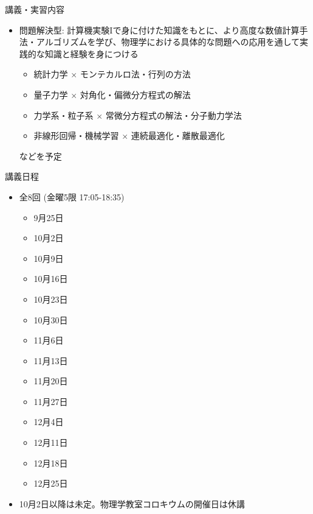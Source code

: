 \begin{frame}[t]{講義・実習内容}
  \begin{itemize}
    \setlength{\itemsep}{1em}
  \item 問題解決型: 計算機実験Iで身に付けた知識をもとに、より高度な数値計算手法・アルゴリズムを学び、物理学における具体的な問題への応用を通して実践的な知識と経験を身につける
    \begin{itemize}
    \item 統計力学 $\times$ モンテカルロ法・行列の方法
    \item 量子力学 $\times$ 対角化・偏微分方程式の解法
    \item 力学系・粒子系 $\times$ 常微分方程式の解法・分子動力学法
    \item 非線形回帰・機械学習 $\times$ 連続最適化・離散最適化
    \end{itemize}
    などを予定
  \end{itemize}
\end{frame}

\begin{frame}[t]{講義日程}
  \begin{itemize}
  \item 全8回 (金曜5限 {\color{red}17:05}-18:35)
    \begin{itemize}
    \item 9月25日
    \item {\color{gray} 10月2日}
    \item {\color{gray} 10月9日}
    \item {\color{gray} 10月16日}
    \item {\color{gray} 10月23日}
    \item {\color{gray} 10月30日}
    \item {\color{gray} 11月6日}
    \item {\color{gray} 11月13日}
    \item {\color{gray} 11月20日}
    \item {\color{gray} 11月27日}
    \item {\color{gray} 12月4日}
    \item {\color{gray} 12月11日}
    \item {\color{gray} 12月18日}
    \item {\color{gray} 12月25日}
    \end{itemize}
  \item 10月2日以降は未定。物理学教室コロキウムの開催日は休講
  \end{itemize}
\end{frame}

